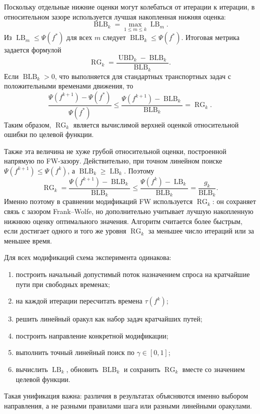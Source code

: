 Поскольку отдельные нижние оценки могут колебаться от итерации к итерации, в относительном
зазоре используется лучшая накопленная нижняя оценка:
\begin{equation}
    \operatorname{BLB}_k
    =
    \max_{1\leq m\leq k}\operatorname{LB}_m.
    \label{eq:blb-relgap}
\end{equation}
Из $\operatorname{LB}_m\leq\Psi(f^\ast)$ для всех $m$ следует
$\operatorname{BLB}_k\leq\Psi(f^\ast)$.
Итоговая метрика задается формулой
\begin{equation}
    \operatorname{RG}_k
    =
    \frac{\operatorname{UBD}_k-\operatorname{BLB}_k}
         {\operatorname{BLB}_k}.
    \label{eq:rg-relgap}
\end{equation}
Если $\operatorname{BLB}_k>0$, что выполняется для стандартных транспортных задач с
положительными временами движения, то
\begin{equation}
    \frac{\Psi(f^{k+1})-\Psi(f^\ast)}{\Psi(f^\ast)}
    \leq
    \frac{\Psi(f^{k+1})-\operatorname{BLB}_k}{\operatorname{BLB}_k}
    =
    \operatorname{RG}_k.
    \label{eq:rg-upper-bound}
\end{equation}
Таким образом, $\operatorname{RG}_k$ является вычислимой верхней оценкой относительной
ошибки по целевой функции.

Также эта величина не хуже грубой относительной оценки, построенной напрямую по FW-зазору.
Действительно, при точном линейном поиске $\Psi(f^{k+1})\leq\Psi(f^k)$, а
$\operatorname{BLB}_k\geq\operatorname{LB}_k$.
Поэтому
\begin{equation}
    \operatorname{RG}_k
    =
    \frac{\Psi(f^{k+1})-\operatorname{BLB}_k}{\operatorname{BLB}_k}
    \leq
    \frac{\Psi(f^k)-\operatorname{LB}_k}{\operatorname{BLB}_k}
    =
    \frac{g_k}{\operatorname{BLB}_k}.
    \label{eq:rg-vs-fw-gap}
\end{equation}
Именно поэтому в сравнении модификаций FW используется $\operatorname{RG}_k$: он сохраняет
связь с зазором Frank--Wolfe, но дополнительно учитывает лучшую накопленную нижнюю оценку
оптимального значения.
Алгоритм считается более быстрым, если достигает одного и того же уровня
$\operatorname{RG}_k$ за меньшее число итераций или за меньшее время.

Для всех модификаций схема эксперимента одинакова:
\begin{enumerate}
    \item построить начальный допустимый поток назначением спроса на кратчайшие пути при свободных временах;
    \item на каждой итерации пересчитать времена $\tau(f^k)$;
    \item решить линейный оракул как набор задач кратчайших путей;
    \item построить направление конкретной модификации;
    \item выполнить точный линейный поиск по $\gamma\in[0,1]$;
    \item вычислить $\operatorname{LB}_k$, обновить $\operatorname{BLB}_k$ и сохранить
    $\operatorname{RG}_k$ вместе со значением целевой функции.
\end{enumerate}
Такая унификация важна: различия в результатах объясняются именно выбором направления,
а не разными правилами шага или разными линейными оракулами.

